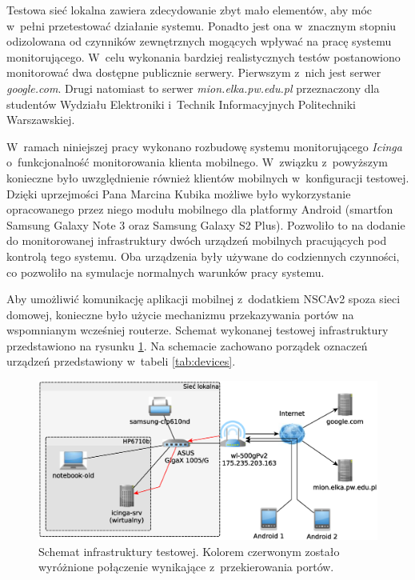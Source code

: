 Testowa sieć lokalna zawiera zdecydowanie zbyt mało elementów, aby móc
w~pełni przetestować działanie systemu. Ponadto jest ona w~znacznym
stopniu odizolowana od czynników zewnętrznych mogących wpływać na
pracę systemu monitorującego. W~celu wykonania bardziej realistycznych
testów postanowiono monitorować dwa dostępne publicznie
serwery. Pierwszym z~nich jest serwer {\em google.com}. Drugi
natomiast to serwer {\em mion.elka.pw.edu.pl} przeznaczony dla
studentów Wydziału Elektroniki i~Technik Informacyjnych Politechniki
Warszawskiej.

W~ramach niniejszej pracy wykonano rozbudowę systemu monitorującego
{\em Icinga} o~funkcjonalność monitorowania klienta
mobilnego. W~związku z~powyższym konieczne było uwzględnienie również
klientów mobilnych w~konfiguracji testowej. Dzięki uprzejmości Pana
Marcina Kubika możliwe było wykorzystanie opracowanego przez niego
modułu mobilnego dla platformy Android (smartfon Samsung Galaxy Note 3
oraz Samsung Galaxy S2 Plus). Pozwoliło to na dodanie do monitorowanej
infrastruktury dwóch urządzeń mobilnych pracujących pod kontrolą tego
systemu. Oba urządzenia były używane do codziennych czynności, co
pozwoliło na symulacje normalnych warunków pracy systemu.

Aby umożliwić komunikację aplikacji mobilnej z~dodatkiem NSCAv2 spoza
sieci domowej, konieczne było użycie mechanizmu przekazywania portów
na wspomnianym wcześniej routerze. Schemat wykonanej testowej
infrastruktury przedstawiono na rysunku \ref{fig:schematSieci}. Na
schemacie zachowano porządek oznaczeń urządzeń przedstawiony w~tabeli
\ref{tab:devices}.

\begin{figure}[ht]
  \caption{Schemat infrastruktury testowej. Kolorem czerwonym zostało
    wyróżnione połączenie wynikające z~przekierowania portów.}
  \label{fig:schematSieci}
  \centering
\includegraphics[width=1\textwidth]{img/schematSieci}
\end{figure}

